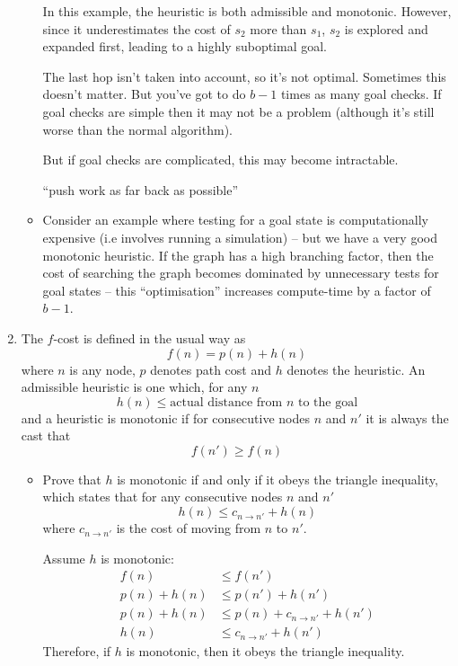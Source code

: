 \documentclass[10pt,\jkfside,a4paper]{article}
\begin{document}
\begin{enumerate}
\begin{itemize}
In this example, the heuristic is both admissible and monotonic. However,
since it underestimates the cost of $s_2$ more than $s_1$, $s_2$ is explored
and expanded first, leading to a highly suboptimal goal.

{\color{blue}
The last hop isn't taken into account, so it's not optimal. Sometimes this
doesn't matter. But you've got to do $b - 1$ times as many goal checks. If
goal checks are simple then it may not be a problem (although it's still
worse than the normal algorithm).

But if goal checks are complicated, this may become intractable.

``push work as far back as possible''
}

\item Consider an example where testing for a goal state is computationally
expensive (i.e involves running a simulation) -- but we have a very good
monotonic heuristic. If the graph has a high branching factor, then the
cost of searching the graph becomes dominated by unnecessary tests for goal
states -- this ``optimisation'' increases compute-time by a factor of $b-1$.

\end{itemize}

\item The $f$-cost is defined in the usual way as
\[
f(n) = p(n) + h(n)
\]
where $n$ is any node, $p$ denotes path cost and $h$ denotes the heuristic. 
An admissible heuristic is one which, for any $n$
\[
h(n) \le \text{actual distance from $n$ to the goal}
\]
and a heuristic is monotonic if for consecutive nodes $n$ and $n'$ it is 
always the cast that
\[
f(n') \ge f(n)
\]
\begin{itemize}

\item Prove that $h$ is monotonic if and only if it obeys the triangle 
inequality, which states that for any consecutive nodes $n$ and $n'$
\[
h(n) \le c_{n \to n'} + h(n)
\]
where $c_{n \to n'}$ is the cost of moving from $n$ to $n'$.

Assume $h$ is monotonic:
\[
\begin{split}
f(n) &\le f(n') \\
p(n) + h(n) &\le p(n') + h(n') \\
p(n) + h(n) &\le p(n) + c_{n \to n'} + h(n') \\
h(n) &\le c_{n \to n'} + h(n')
\end{split}
\]
Therefore, if $h$ is monotonic, then it obeys the triangle inequality.


\end{itemize}
\end{enumerate}
\end{document}
